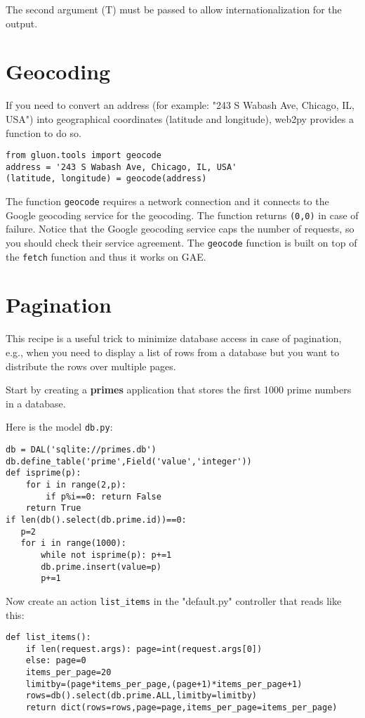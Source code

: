 \documentclass[justified,sixbynine,notoc]{tufte-book}
\def\ft{\small\tt}
\def\inxx#1{\index{#1}}
\begin{document}
\begin{fullwidth}
The second argument (T) must be passed to allow internationalization for the output.

\goodbreak\section{Geocoding}

\inxx{geocode}

If you need to convert an address (for example: "243 S Wabash Ave, Chicago, IL, USA") into geographical coordinates (latitude and longitude), web2py provides a function to do so.
\begin{lstlisting}
from gluon.tools import geocode
address = '243 S Wabash Ave, Chicago, IL, USA'
(latitude, longitude) = geocode(address)
\end{lstlisting}

The function {\ft geocode} requires a network connection and it connects to the Google geocoding service for the geocoding. The function returns {\ft (0,0)} in case of failure. Notice that the Google geocoding service caps the number of requests, so you should check their service agreement. The {\ft geocode} function is built on top of the {\ft fetch} function and thus it works on GAE.

\goodbreak\section{Pagination}

\inxx{pagination}

This recipe is a useful trick to minimize database access in case of pagination, e.g., when you need to display a list of rows from a database but you want to distribute the rows over multiple pages.

Start by creating a {\bf primes} application that stores the first 1000 prime numbers in a database.

Here is the model {\ft db.py}:
\begin{lstlisting}
db = DAL('sqlite://primes.db')
db.define_table('prime',Field('value','integer'))
def isprime(p):
    for i in range(2,p):
        if p%i==0: return False
    return True
if len(db().select(db.prime.id))==0:
   p=2
   for i in range(1000):
       while not isprime(p): p+=1
       db.prime.insert(value=p)
       p+=1
\end{lstlisting}

Now create an action {\ft list\_items} in the "default.py" controller that reads like this:
\begin{lstlisting}
def list_items():
    if len(request.args): page=int(request.args[0])
    else: page=0
    items_per_page=20
    limitby=(page*items_per_page,(page+1)*items_per_page+1)
    rows=db().select(db.prime.ALL,limitby=limitby)
    return dict(rows=rows,page=page,items_per_page=items_per_page)
\end{lstlisting}


\end{fullwidth}
\end{document}
